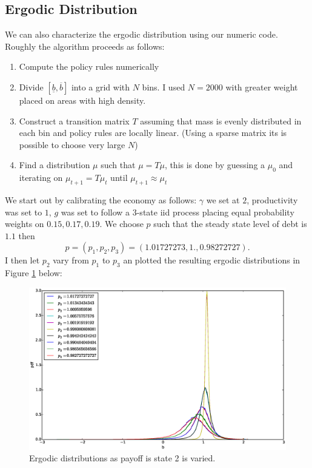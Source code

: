 \documentclass[12pt]{article}
\begin{document}
\subsection{Ergodic Distribution}
We can also characterize the ergodic distribution using our numeric code.  Roughly the algorithm proceeds as follows:
\begin{enumerate}
	\item Compute the policy rules numerically
	\item Divide $[\underline b,\overline b]$ into a grid with $N$ bins.  I used $N = 2000$ with greater weight placed on areas with high density.
	\item  Construct a transition matrix $T$ assuming that mass is evenly distributed in each bin and policy rules are locally linear. (Using a sparse matrix its is possible to choose very large $N$)
	\item  Find a distribution $\mu$ such that $\mu = T\mu$, this is done by guessing a $\mu_0$ and iterating on $\mu_{t+1} = T\mu_t$ until $\mu_{t+1}\approx\mu_t$
\end{enumerate}

We start out by calibrating the economy as follows:  $\gamma$ we set at $2$, productivity was set to $1$, $g$ was set to follow a 3-state iid process placing equal probability weights on $0.15,0.17,0.19$.  We choose $p$ such that the steady state level of debt is $1.1$ then
\[
	p = (p_1,p_2,p_3) = (1.01727273,  1.,  0.98272727).
\]  I then let $p_2$ vary from $p_1$ to $p_3$ an plotted the resulting ergodic distributions in Figure \ref{fig.erg_dist} below:
\begin{figure}[ht]
	\includegraphics[width=\textwidth]{Images/ergodic_dist.eps}
	\caption{Ergodic distributions as payoff is state 2 is varied.\label{fig.erg_dist}}
\end{figure}
\end{document}
